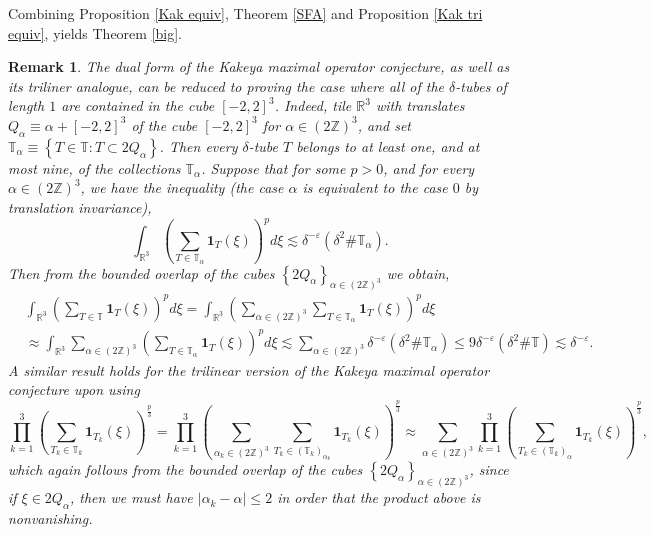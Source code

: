 \documentclass{amsart}%
\theoremstyle{plain}
\newtheorem{remark}[theorem]{Remark}
\numberwithin{equation}{section}
\begin{document}
Combining Proposition \ref{Kak equiv}, Theorem \ref{SFA} and Proposition
\ref{Kak tri equiv}, yields Theorem \ref{big}.

\begin{remark}
The dual form of the Kakeya maximal operator conjecture, as well as its
triliner analogue, can be reduced to proving the case where all of the
$\delta$-tubes of length $1$ are contained in the cube $\left[  -2,2\right]
^{3}$. Indeed, tile $\mathbb{R}^{3}$ with translates $Q_{\alpha}\equiv
\alpha+\left[  -2,2\right]  ^{3}$ of the cube $\left[  -2,2\right]  ^{3}$ for
$\alpha\in\left(  2\mathbb{Z}\right)  ^{3}$, and set $\mathbb{T}_{\alpha
}\equiv\left\{  T\in\mathbb{T}:T\subset2Q_{\alpha}\right\}  $. Then every
$\delta$-tube $T$ belongs to at least one, and at most nine, of the
collections $\mathbb{T}_{\alpha}$. Suppose that for some $p>0$, and for every
$\alpha\in\left(  2\mathbb{Z}\right)  ^{3}$, we have the inequality (the case
$\alpha$ is equivalent to the case $0$ by translation invariance),%
\[
\int_{\mathbb{R}^{3}}\left(  \sum_{T\in\mathbb{T}_{\alpha}}\mathbf{1}%
_{T}\left(  \xi\right)  \right)  ^{p}d\xi\lesssim\delta^{-\varepsilon}\left(
\delta^{2}\#\mathbb{T}_{\alpha}\right)  .
\]
Then from the bounded overlap of the cubes $\left\{  2Q_{\alpha}\right\}
_{\alpha\in\left(  2\mathbb{Z}\right)  ^{3}}$ we obtain,
\begin{align*}
&  \int_{\mathbb{R}^{3}}\left(  \sum_{T\in\mathbb{T}}\mathbf{1}_{T}\left(
\xi\right)  \right)  ^{p}d\xi=\int_{\mathbb{R}^{3}}\left(  \sum_{\alpha
\in\left(  2\mathbb{Z}\right)  ^{3}}\sum_{T\in\mathbb{T}_{\alpha}}%
\mathbf{1}_{T}\left(  \xi\right)  \right)  ^{p}d\xi\\
&  \approx\int_{\mathbb{R}^{3}}\sum_{\alpha\in\left(  2\mathbb{Z}\right)
^{3}}\left(  \sum_{T\in\mathbb{T}_{\alpha}}\mathbf{1}_{T}\left(  \xi\right)
\right)  ^{p}d\xi\lesssim\sum_{\alpha\in\left(  2\mathbb{Z}\right)  ^{3}%
}\delta^{-\varepsilon}\left(  \delta^{2}\#\mathbb{T}_{\alpha}\right)
\leq9\delta^{-\varepsilon}\left(  \delta^{2}\#\mathbb{T}\right)
\lesssim\delta^{-\varepsilon}.
\end{align*}
A similar result holds for the trilinear version of the Kakeya maximal
operator conjecture upon using%
\[
\prod_{k=1}^{3}\left(  \sum_{T_{k}\in\mathbb{T}_{k}}\mathbf{1}_{T_{k}}\left(
\xi\right)  \right)  ^{\frac{p}{3}}=\prod_{k=1}^{3}\left(  \sum_{\alpha_{k}%
\in\left(  2\mathbb{Z}\right)  ^{3}}\sum_{T_{k}\in\left(  \mathbb{T}%
_{k}\right)  _{\alpha_{k}}}\mathbf{1}_{T_{k}}\left(  \xi\right)  \right)
^{\frac{p}{3}}\approx\sum_{\alpha\in\left(  2\mathbb{Z}\right)  ^{3}}%
\prod_{k=1}^{3}\left(  \sum_{T_{k}\in\left(  \mathbb{T}_{k}\right)  _{\alpha}%
}\mathbf{1}_{T_{k}}\left(  \xi\right)  \right)  ^{\frac{p}{3}},
\]
which again follows from the bounded overlap of the cubes $\left\{
2Q_{\alpha}\right\}  _{\alpha\in\left(  2\mathbb{Z}\right)  ^{3}}$, since if
$\xi\in2Q_{\alpha}$, then we must have $\left\vert \alpha_{k}-\alpha
\right\vert \leq2$ in order that the product above is nonvanishing.
\end{remark}
\end{document}
